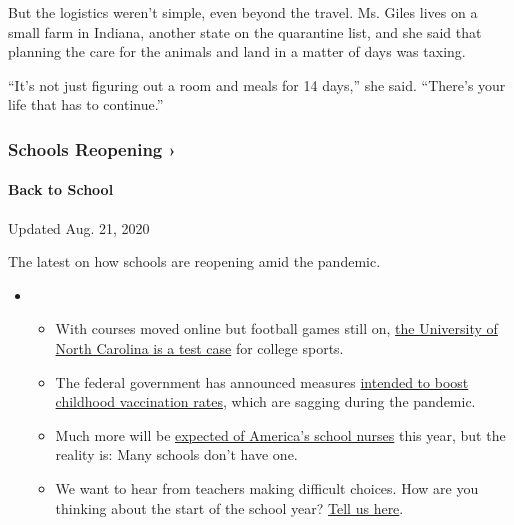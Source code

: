 But the logistics weren't simple, even beyond the travel. Ms. Giles
lives on a small farm in Indiana, another state on the quarantine list,
and she said that planning the care for the animals and land in a matter
of days was taxing.

``It's not just figuring out a room and meals for 14 days,'' she said.
``There's your life that has to continue.''

\href{https://www.nytimes3xbfgragh.onion/spotlight/schools-reopening?action=click\&pgtype=Article\&state=default\&region=MAIN_CONTENT_3\&context=storylines_keepup}{}

\hypertarget{schools-reopening-}{%
\subsubsection{Schools Reopening ›}\label{schools-reopening-}}

\hypertarget{back-to-school}{%
\paragraph{Back to School}\label{back-to-school}}

Updated Aug. 21, 2020

The latest on how schools are reopening amid the pandemic.

\begin{itemize}
\item
  \begin{itemize}
  \tightlist
  \item
    With courses moved online but football games still on,
    \href{https://www.nytimes3xbfgragh.onion/2020/08/18/sports/ncaafootball/unc-football-acc-online-classes.html?action=click\&pgtype=Article\&state=default\&region=MAIN_CONTENT_3\&context=storylines_keepup}{the
    University of North Carolina is a test case} for college sports.
  \item
    The federal government has announced measures
    \href{https://www.nytimes3xbfgragh.onion/2020/08/20/health/coronavirus-flu-vaccine.html?action=click\&pgtype=Article\&state=default\&region=MAIN_CONTENT_3\&context=storylines_keepup}{intended
    to boost childhood vaccination rates}, which are sagging during the
    pandemic.
  \item
    Much more will be
    \href{https://www.nytimes3xbfgragh.onion/2020/08/20/us/schools-reopening-nurses-covid.html?action=click\&pgtype=Article\&state=default\&region=MAIN_CONTENT_3\&context=storylines_keepup}{expected
    of America's school nurses} this year, but the reality is: Many
    schools don't have one.
  \item
    We want to hear from teachers making difficult choices. How are you
    thinking about the start of the school year?
    \href{https://www.nytimes3xbfgragh.onion/2020/08/19/us/teachers-school-reopenings.html?action=click\&pgtype=Article\&state=default\&region=MAIN_CONTENT_3\&context=storylines_keepup}{Tell
    us here}.
  \end{itemize}
\end{itemize}

